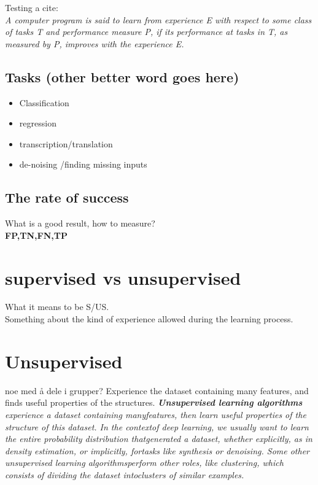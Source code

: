 \documentclass[a4paper,english]{ifimaster}
\begin{document}
	Testing a cite:\\

	\textit{ A computer program is said to learn from experience E with respect to 
	some class of tasks T and performance measure P, if its performance at
	tasks in T, as measured by P, improves with the experience E. } 
	\cite{MitchellTomM1997Ml}
	  \subsection{Tasks (other better word goes here)}
\label{chap:Tasks}
\begin{itemize}
 \item Classification
 \item regression 
 \item transcription/translation
 \item de-noising /finding missing inputs
\end{itemize}
\subsection{The rate of success}
What is a good result, how to measure?\\
\textbf{FP,TN,FN,TP}\\


\section{supervised vs unsupervised}
What it means to be S/US.\\
Something about the kind of experience allowed during the learning process.


\section{Unsupervised}
noe med å dele i grupper?
Experience the dataset containing many features, and finds useful properties of the structures. 
\textit{\textbf{Unsupervised learning algorithms} experience a dataset containing manyfeatures, then learn useful properties of the structure of this dataset. In the contextof deep learning, we usually want to learn the entire probability distribution thatgenerated a dataset, whether explicitly, as in density estimation, or implicitly, fortasks like synthesis or denoising. Some other unsupervised learning algorithmsperform other roles, like clustering, which consists of dividing the dataset intoclusters of similar examples.}
\cite{Goodfellow-et-al-2016}
\end{document}
